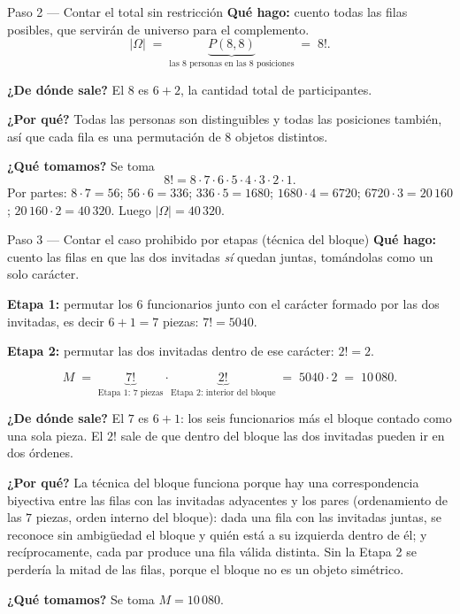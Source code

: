 \documentclass[11pt]{article}
\begin{document}
\begin{paso}{Paso 2 --- Contar el total sin restricción}
\textbf{Qué hago:} cuento todas las filas posibles, que servirán de universo para el complemento.
\[
  |\Omega| \;=\; \underbrace{P(8,8)}_{\text{las 8 personas en las 8 posiciones}} \;=\; 8! .
\]

\textbf{¿De dónde sale?} El $8$ es $6+2$, la cantidad total de participantes.

\textbf{¿Por qué?} Todas las personas son distinguibles y todas las posiciones también, así que cada fila es una permutación de $8$ objetos distintos.

\textbf{¿Qué tomamos?} Se toma
\[
  8! = 8\cdot 7\cdot 6\cdot 5\cdot 4\cdot 3\cdot 2\cdot 1 .
\]
Por partes: $8\cdot 7=56$; $56\cdot 6=336$; $336\cdot 5=1680$; $1680\cdot 4=6720$; $6720\cdot 3=20\,160$; $20\,160\cdot 2=40\,320$. Luego $|\Omega|=40\,320$.
\end{paso}

\begin{paso}{Paso 3 --- Contar el caso prohibido por etapas (técnica del bloque)}
\textbf{Qué hago:} cuento las filas en que las dos invitadas \emph{sí} quedan juntas, tomándolas como un solo carácter.

\medskip
\textbf{Etapa 1:} permutar los $6$ funcionarios junto con el carácter formado por las dos invitadas, es decir $6+1=7$ piezas: $7!=5040$.

\textbf{Etapa 2:} permutar las dos invitadas dentro de ese carácter: $2!=2$.

\medskip
\[
  M \;=\; \underbrace{7!}_{\text{Etapa 1: 7 piezas}} \cdot \underbrace{2!}_{\text{Etapa 2: interior del bloque}} \;=\; 5040\cdot 2 \;=\; 10\,080 .
\]

\textbf{¿De dónde sale?} El $7$ es $6+1$: los seis funcionarios más el bloque contado como una sola pieza. El $2!$ sale de que dentro del bloque las dos invitadas pueden ir en dos órdenes.

\textbf{¿Por qué?} La técnica del bloque funciona porque hay una correspondencia biyectiva entre las filas con las invitadas adyacentes y los pares (ordenamiento de las $7$ piezas, orden interno del bloque): dada una fila con las invitadas juntas, se reconoce sin ambigüedad el bloque y quién está a su izquierda dentro de él; y recíprocamente, cada par produce una fila válida distinta. Sin la Etapa 2 se perdería la mitad de las filas, porque el bloque no es un objeto simétrico.

\textbf{¿Qué tomamos?} Se toma $M = 10\,080$.
\end{paso}
\end{document}

